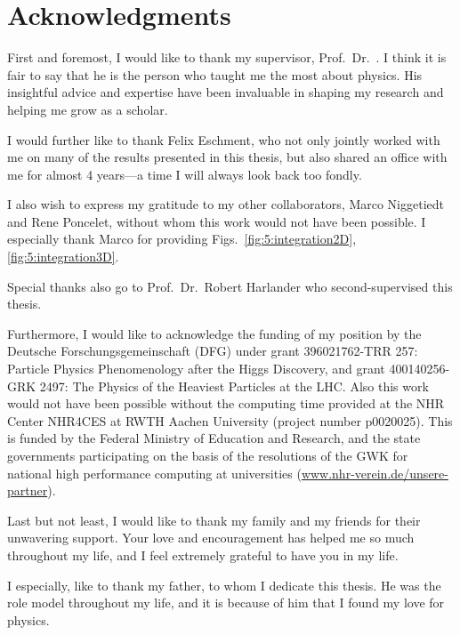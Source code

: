 
\begingroup
\let\clearpage\relax
\let\cleardoublepage\relax
\let\cleardoublepage\relax
\chapter*{Acknowledgments}

First and foremost, I would like to thank my supervisor, Prof.\ Dr.\ \mySupervisor. I think it is fair to say that he is the person who taught me the most about physics. His insightful advice and expertise have been invaluable in shaping my research and helping me grow as a scholar.

I would further like to thank Felix Eschment, who not only jointly worked with me on many of the results presented in this thesis, but also shared an office with me for almost 4 years---a time I will always look back too fondly.

I also wish to express my gratitude to my other collaborators, Marco Niggetiedt and Rene Poncelet, without whom this work would not have been possible. I especially thank Marco for providing Figs.~\ref{fig:5:integration2D}, \ref{fig:5:integration3D}.

Special thanks also go to Prof.\ Dr.\ Robert Harlander who second-supervised this thesis.

Furthermore, I would like to acknowledge the funding of my position by the Deutsche Forschungsgemeinschaft (DFG) under grant 396021762-TRR 257: Particle Physics Phenomenology after the Higgs Discovery, and grant 400140256-GRK 2497: The Physics of the Heaviest Particles at the LHC. Also this work would not have been possible without the computing time provided at the NHR Center NHR4CES at RWTH Aachen University (project number p0020025). This is funded by the Federal Ministry of Education and Research, and the state governments participating on the basis of the resolutions of the GWK for national high performance computing at universities (\url{www.nhr-verein.de/unsere-partner}).

Last but not least, I would like to thank my family and my friends for their unwavering support. Your love and encouragement has helped me so much throughout my life, and I feel extremely grateful to have you in my life.

I especially, like to thank my father, to whom I dedicate this thesis. He was the role model throughout my life, and it is because of him that I found my love for physics.

\endgroup
